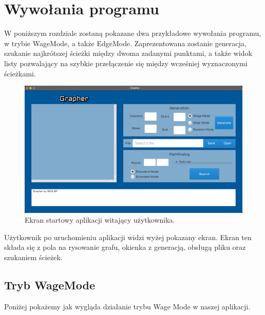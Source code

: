\documentclass[10pt, a4paper]{report}
\begin{document}
\newpage

\section{Wywołania programu}\label{sec:wywołania-programu}
W poniższym rozdziale zostaną pokazane dwa przykładowe wywołania programu, w
trybie WageMode, a także EdgeMode.
Zaprezentowana zostanie generacja, szukanie najkrótszej ścieżki między dwoma
zadanymi punktami,
a także widok listy pozwalający na szybkie przełączenie się między wcześniej
wyznaczonymi ścieżkami.

\begin{figure}[h]
  \begin{center}
    \includegraphics[scale=0.165]{graperStartScreen.jpg}
    \caption{Ekran startowy aplikacji witający użytkownika.}
  \end{center}
\end{figure}

Użytkownik po uruchomieniu aplikacji widzi wyżej pokazany ekran. Ekran ten
składa się z pola na rysowanie grafu, okienka z generacją, obsługą pliku oraz
szukaniem ścieżek.
\newpage

\subsection{Tryb WageMode}\label{subsec:wywołania-wagemode}
Poniżej pokażemy jak wygląda działanie trybu Wage Mode w naszej aplikacji.
\end{document}
